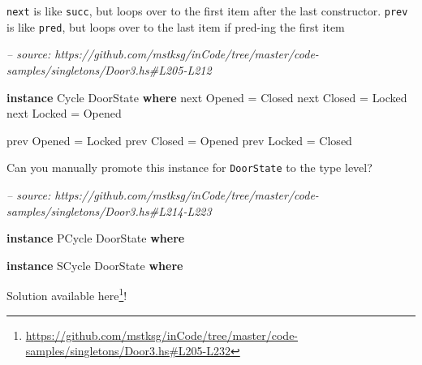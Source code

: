 \documentclass[]{article}
\newenvironment{Shaded}{}{}
\newcommand{\CommentTok}[1]{\textcolor[rgb]{0.38,0.63,0.69}{\textit{#1}}}
\newcommand{\DataTypeTok}[1]{\textcolor[rgb]{0.56,0.13,0.00}{#1}}
\newcommand{\FunctionTok}[1]{\textcolor[rgb]{0.02,0.16,0.49}{#1}}
\newcommand{\KeywordTok}[1]{\textcolor[rgb]{0.00,0.44,0.13}{\textbf{#1}}}
\newcommand{\NormalTok}[1]{#1}
\renewcommand{\href}[2]{#2\footnote{\url{#1}}}
\begin{document}
\begin{enumerate}
\begin{Shaded}
\end{Shaded}

  \texttt{next} is like \texttt{succ}, but loops over to the first item after
  the last constructor. \texttt{prev} is like \texttt{pred}, but loops over to
  the last item if pred-ing the first item

\begin{Shaded}
\begin{Highlighting}[]
\CommentTok{-- source: https://github.com/mstksg/inCode/tree/master/code-samples/singletons/Door3.hs#L205-L212}

\KeywordTok{instance} \DataTypeTok{Cycle} \DataTypeTok{DoorState} \KeywordTok{where}
\NormalTok{    next }\DataTypeTok{Opened} \FunctionTok{=} \DataTypeTok{Closed}
\NormalTok{    next }\DataTypeTok{Closed} \FunctionTok{=} \DataTypeTok{Locked}
\NormalTok{    next }\DataTypeTok{Locked} \FunctionTok{=} \DataTypeTok{Opened}

\NormalTok{    prev }\DataTypeTok{Opened} \FunctionTok{=} \DataTypeTok{Locked}
\NormalTok{    prev }\DataTypeTok{Closed} \FunctionTok{=} \DataTypeTok{Opened}
\NormalTok{    prev }\DataTypeTok{Locked} \FunctionTok{=} \DataTypeTok{Closed}
\end{Highlighting}
\end{Shaded}

  Can you manually promote this instance for \texttt{DoorState} to the type
  level?

\begin{Shaded}
\begin{Highlighting}[]
\CommentTok{-- source: https://github.com/mstksg/inCode/tree/master/code-samples/singletons/Door3.hs#L214-L223}

\KeywordTok{instance} \DataTypeTok{PCycle} \DataTypeTok{DoorState} \KeywordTok{where}

\KeywordTok{instance} \DataTypeTok{SCycle} \DataTypeTok{DoorState} \KeywordTok{where}
\end{Highlighting}
\end{Shaded}

  Solution available
  \href{https://github.com/mstksg/inCode/tree/master/code-samples/singletons/Door3.hs\#L205-L232}{here}!
\end{enumerate}
\end{document}
